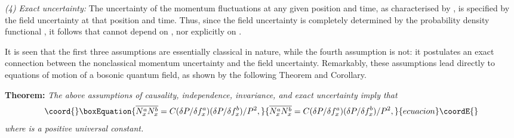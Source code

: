 \documentclass[a4paper,preprint, showpacs, aps, draft]{revtex4}
\begin{document}
{{\it (4) Exact uncertainty:} The uncertainty of the momentum
fluctuations at any given position and time, as characterised by \coordHE{}, is specified by the field uncertainty at that position and
time.  Thus, since the field uncertainty is completely determined by the
probability density functional \coordHE{}, it follows that \coordHE{}
cannot depend on \coordHE{}, nor explicitly on \coordHE{}. 

It is seen that the first three assumptions are essentially 
classical in nature, 
while the fourth assumption is not: it postulates an exact connection
between the nonclassical momentum uncertainty and the field uncertainty.   
Remarkably, these assumptions lead
directly to equations of motion of a bosonic quantum field, as shown by
the following Theorem and Corollary.

{\bf Theorem:}  {\it The above assumptions of causality, independence,
invariance, and 
exact uncertainty imply that} 
\begin{equation}\coord{}\boxEquation{ \label{theorem}
\overline{N^a_xN^b_x} = C (\delta P/\delta f^a_x) (\delta P/\delta
f^b_x)/P^2 ,
}{ \overline{N^a_xN^b_x} = C (\delta P/\delta f^a_x) (\delta P/\delta
f^b_x)/P^2 ,
}{ecuacion}\coordE{}\end{equation}
{\it where \coordHE{} is a positive universal constant.}  

}
\end{document}
